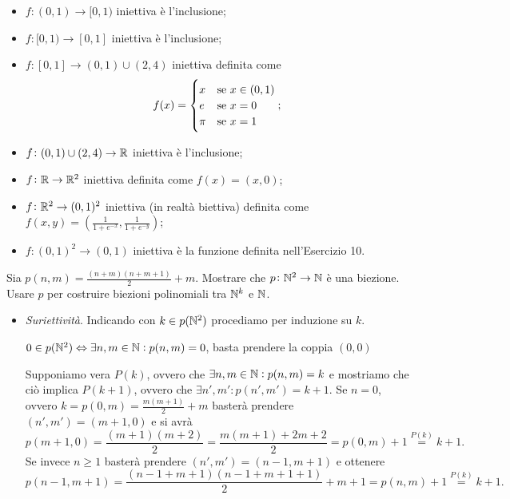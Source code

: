 \documentclass[a4paper]{article}\par \usepackage{style}\par
\begin{document}
\begin{itemize}
\item $ f \colon (0, 1) \to [0, 1) $ iniettiva è l'inclusione;
\item $ f \colon [0, 1) \to [0, 1] $ iniettiva è l'inclusione;
\item $ f \colon [0, 1] \to (0, 1) \cup (2, 4) $ iniettiva definita come
  \[f(x) =
    \begin{cases}
      x & \text{se $ x \in (0, 1) $} \\
      e & \text{se $ x = 0 $} \\
      \pi & \text{se $ x = 1 $} \\
    \end{cases};\]
\item $ f \colon (0, 1) \cup (2, 4) \to \mathbb{R} $ iniettiva è l'inclusione;
\item $ f \colon \mathbb{R} \to \mathbb{R}^2 $ iniettiva definita come $ f(x) = (x, 0) $;
\item $ f \colon \mathbb{R}^2 \to (0, 1)^2 $ iniettiva (in realtà biettiva) definita come $ f(x, y) = \left(\frac{1}{1 + e^{-x}}, \frac{1}{1 + e^{-y}}\right) $;
\item $ f \colon (0, 1)^2 \to (0, 1) $ iniettiva è la funzione definita nell'Esercizio 10.
\end{itemize}\par \begin{es}
  Sia $ p(n, m) = \frac{(n + m)(n + m + 1)}{2} + m $. Mostrare che $ p \colon \mathbb{N}^2 \to \mathbb{N} $ è una biezione. Usare $ p $ per costruire biezioni polinomiali tra $ \mathbb{N}^k $ e $ \mathbb{N} $.
\end{es}\par \begin{itemize}
\item \emph{Suriettività}. Indicando con $ k \in p(\mathbb{N}^2) $ procediamo per induzione su $ k $.
  \begin{pbase}
    $ 0 \in p(\mathbb{N}^2) \Leftrightarrow \exists n, m \in \mathbb{N} : p(n, m) = 0 $, basta prendere la coppia $ (0, 0) $
  \end{pbase}
  \begin{pind}
    Supponiamo vera $ P(k) $, ovvero che $ \exists n, m \in \mathbb{N} : p(n, m) = k $ e mostriamo che ciò implica $ P(k + 1) $, ovvero che $ \exists n', m' : p(n', m') = k + 1 $. Se $ n = 0 $, ovvero $ k = p(0, m) = \frac{m (m + 1)}{2} + m $ basterà prendere $ (n', m') = (m + 1, 0) $ e si avrà \[p(m + 1, 0) = \frac{(m + 1)(m + 2)}{2} = \frac{m (m + 1) + 2m + 2}{2} = p(0, m) + 1 \overset{P(k)}{=} k + 1.\] Se invece $ n \geq 1 $ basterà prendere $ (n', m') = (n - 1, m + 1) $ e ottenere \[p(n - 1, m + 1) = \frac{(n - 1 + m + 1)(n - 1 + m + 1 + 1)}{2} + m + 1 = p(n, m) + 1 \overset{P(k)}{=} k + 1.\]

\end{pind}
\end{itemize}
\end{document}
